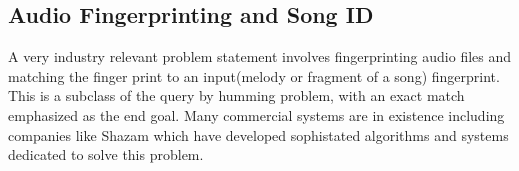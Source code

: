 \subsection{Audio Fingerprinting and Song ID}

\noindent A very industry relevant problem statement involves fingerprinting audio files and matching the finger print to an input(melody or fragment of a song) fingerprint. This is a subclass of the query by humming problem, with an exact match emphasized as the end goal. Many commercial systems are in existence including companies like Shazam \cite{shazam} which have developed sophistated algorithms and systems dedicated to solve this problem.



